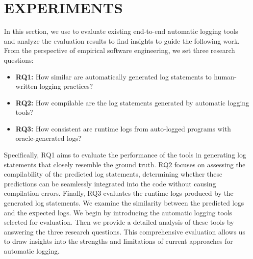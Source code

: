 \section{EXPERIMENTS}
\label{sec:eval}
In this section, we use \methodname to evaluate existing end-to-end automatic logging tools and analyze the evaluation results to find insights to guide the following work. From the perspective of empirical software engineering, we set three research questions:
\begin{itemize}
    \item \textbf{RQ1:} How similar are automatically generated log statements to human-written logging practices?
    \item \textbf{RQ2:} How compilable are the log statements generated by automatic logging tools?
    \item \textbf{RQ3:} How consistent are runtime logs from auto-logged programs with oracle-generated logs?
\end{itemize}

    Specifically, RQ1 aims to evaluate the performance of the tools in generating log statements that closely resemble the ground truth. RQ2 focuses on assessing the compilability of the predicted log statements, determining whether these predictions can be seamlessly integrated into the code without causing compilation errors. Finally, RQ3 evaluates the runtime logs produced by the generated log statements. We examine the similarity between the predicted logs and the expected logs. We begin by introducing the automatic logging tools selected for evaluation. Then we provide a detailed analysis of these tools by answering the three research questions. This comprehensive evaluation allows us to draw insights into the strengths and limitations of current approaches for automatic logging.

